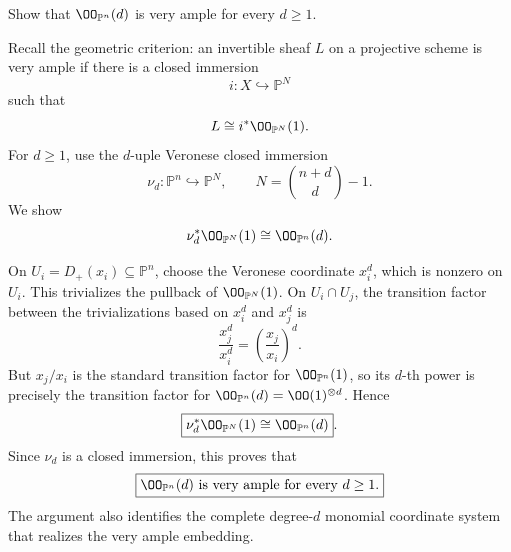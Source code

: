 \begin{problem}\label{prob:vi38-12}
Show that \(\OO_{\mathbb P^n}(d)\) is very ample for every \(d\ge1\).
\end{problem}

\ifdefined\FullProblemDossiers
\begin{solution}
Recall the geometric criterion: an invertible sheaf \(L\) on a projective scheme is
very ample if there is a closed immersion
\[
i:X\hookrightarrow\mathbb P^N
\]
such that
\[
L\cong i^*\OO_{\mathbb P^N}(1).
\]
For \(d\ge1\), use the \(d\)-uple Veronese closed immersion
\[
\nu_d:\mathbb P^n\hookrightarrow\mathbb P^N,
\qquad
N=\binom{n+d}{d}-1.
\]
We show
\[
\nu_d^*\OO_{\mathbb P^N}(1)\cong\OO_{\mathbb P^n}(d).
\]

On \(U_i=D_+(x_i)\subseteq\mathbb P^n\), choose the Veronese coordinate
\(x_i^d\), which is nonzero on \(U_i\). This trivializes the pullback of
\(\OO_{\mathbb P^N}(1)\). On \(U_i\cap U_j\), the transition factor between the
trivializations based on \(x_i^d\) and \(x_j^d\) is
\[
\frac{x_j^d}{x_i^d}
=
\left(\frac{x_j}{x_i}\right)^d.
\]
But \(x_j/x_i\) is the standard transition factor for \(\OO_{\mathbb P^n}(1)\), so
its \(d\)-th power is precisely the transition factor for
\(\OO_{\mathbb P^n}(d)=\OO(1)^{\otimes d}\). Hence
\[
\boxed{\nu_d^*\OO_{\mathbb P^N}(1)\cong\OO_{\mathbb P^n}(d)}.
\]
Since \(\nu_d\) is a closed immersion, this proves that
\[
\boxed{\OO_{\mathbb P^n}(d)\text{ is very ample for every }d\ge1.}
\]
The argument also identifies the complete degree-\(d\) monomial coordinate system
that realizes the very ample embedding.
\end{solution}
\fi
